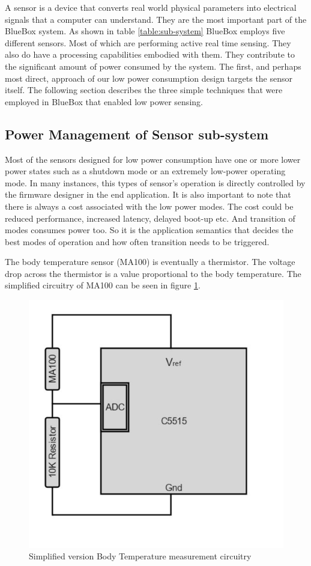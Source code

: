  A sensor is a device that converts real world physical parameters into electrical signals that a computer can understand.  They are the most important part of the BlueBox system. As shown in table \ref{table:sub-system} BlueBox employs five different sensors. Most of which are performing active real time sensing. They also do have a processing capabilities embodied with them. They contribute to the significant amount of power consumed by the system.  
 The first, and perhaps most direct, approach of our low power consumption design targets the sensor itself. The following section describes the three simple techniques that were employed in BlueBox that enabled low power sensing.
 \subsection{Power Management of Sensor sub-system}
   Most of the sensors designed for low power consumption have one or more lower power states such as a shutdown mode or an extremely low-power operating mode. In many instances, this types of sensor's operation is directly controlled by  the firmware designer in the end application. It is also important to note that there is always a cost associated with the low power modes. The cost could be reduced performance, increased latency, delayed boot-up etc. And transition of modes consumes power too. So it is the application semantics that decides the best modes of operation and how often transition needs to be triggered. 
 
 
 The body temperature sensor (MA100) is eventually a thermistor. The voltage drop across the thermistor is a value proportional to the body temperature. The simplified circuitry of MA100 can be seen in figure \ref{body_temp}.
 \begin{figure}[h]
 	\centering
 	\includegraphics[scale = 0.5 ]{body_temp.JPG}
 	\caption{Simplified version Body Temperature measurement circuitry\label{body_temp}}
 \end{figure}
 
